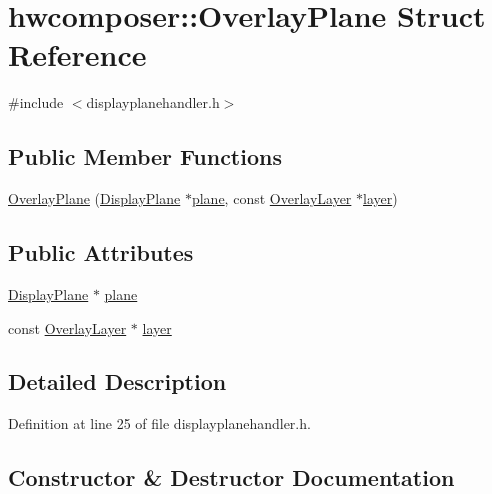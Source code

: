 \hypertarget{structhwcomposer_1_1OverlayPlane}{}\section{hwcomposer\+:\+:Overlay\+Plane Struct Reference}
\label{structhwcomposer_1_1OverlayPlane}


{\ttfamily \#include $<$displayplanehandler.\+h$>$}

\subsection*{Public Member Functions}
\begin{DoxyCompactItemize}
\item 
\mbox{\hyperlink{structhwcomposer_1_1OverlayPlane_a5e7b18ef6bdb32f24bbb9e8adfcc1f3e}{Overlay\+Plane}} (\mbox{\hyperlink{classhwcomposer_1_1DisplayPlane}{Display\+Plane}} $\ast$\mbox{\hyperlink{structhwcomposer_1_1OverlayPlane_a597d0d3f4ab54cfe7e769d3316f63ec7}{plane}}, const \mbox{\hyperlink{structhwcomposer_1_1OverlayLayer}{Overlay\+Layer}} $\ast$\mbox{\hyperlink{structhwcomposer_1_1OverlayPlane_a8780236232b7473f1b208db5969b18a1}{layer}})
\end{DoxyCompactItemize}
\subsection*{Public Attributes}
\begin{DoxyCompactItemize}
\item 
\mbox{\hyperlink{classhwcomposer_1_1DisplayPlane}{Display\+Plane}} $\ast$ \mbox{\hyperlink{structhwcomposer_1_1OverlayPlane_a597d0d3f4ab54cfe7e769d3316f63ec7}{plane}}
\item 
const \mbox{\hyperlink{structhwcomposer_1_1OverlayLayer}{Overlay\+Layer}} $\ast$ \mbox{\hyperlink{structhwcomposer_1_1OverlayPlane_a8780236232b7473f1b208db5969b18a1}{layer}}
\end{DoxyCompactItemize}


\subsection{Detailed Description}


Definition at line 25 of file displayplanehandler.\+h.



\subsection{Constructor \& Destructor Documentation}
\mbox{\label{structhwcomposer_1_1OverlayPlane_a5e7b18ef6bdb32f24bbb9e8adfcc1f3e}} 
